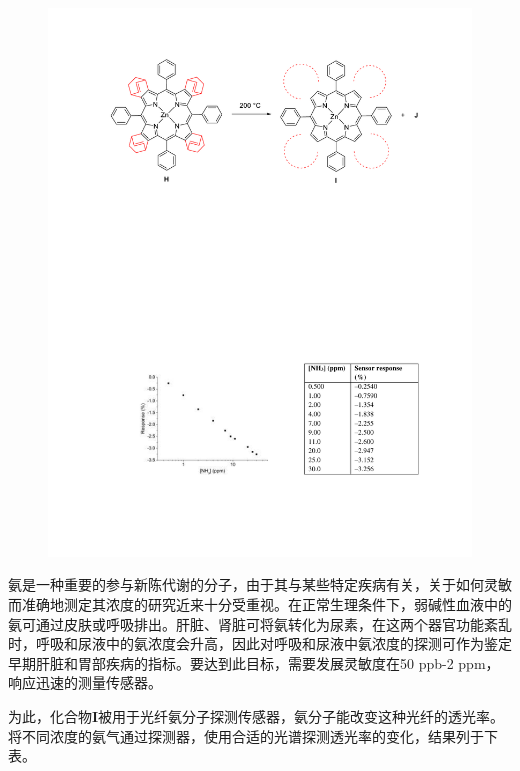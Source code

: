 \begin{figure}[h]
	\centering
	\includegraphics[width=13cm]{./pic/t11-3.pdf}
\end{figure}

氨是一种重要的参与新陈代谢的分子，由于其与某些特定疾病有关，关于如何灵敏而准确地测定其浓度的研究近来十分受重视。在正常生理条件下，弱碱性血液中的氨可通过皮肤或呼吸排出。肝脏、肾脏可将氨转化为尿素，在这两个器官功能紊乱时，呼吸和尿液中的氨浓度会升高，因此对呼吸和尿液中氨浓度的探测可作为鉴定早期肝脏和胃部疾病的指标。要达到此目标，需要发展灵敏度在50 ppb-2 ppm，响应迅速的测量传感器。

为此，化合物\textbf{I}被用于光纤氨分子探测传感器，氨分子能改变这种光纤的透光率。将不同浓度的氨气通过探测器，使用合适的光谱探测透光率的变化，结果列于下表。

